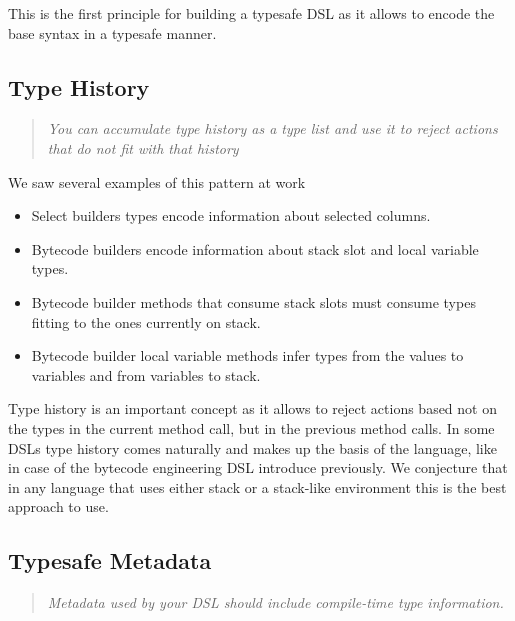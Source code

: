 \documentclass{sig-alternate}
\begin{document}
This is the first principle for building a typesafe DSL as it allows to encode the base syntax in a typesafe manner.

\subsection{Type History}

\begin{quote}
\emph{You can accumulate type history as a type list and use it to reject actions that do not fit with that history}
\end{quote}

We saw several examples of this pattern at work
\begin{itemize}
\item Select builders types encode information about selected columns. 
\item Bytecode builders encode information about stack slot and local variable types.
\item Bytecode builder methods that consume stack slots must consume types fitting to the ones currently on stack.
\item Bytecode builder local variable methods infer types from the values to variables and from variables to stack.
\end{itemize}

Type history is an important concept as it allows to reject actions based not on the types in the current method call, but in the previous method calls. In some DSLs type history comes naturally and makes up the basis of the language, like in case of the bytecode engineering DSL introduce previously. We conjecture that in any language that uses either stack or a stack-like environment this is the best approach to use.

\subsection{Typesafe Metadata}

\begin{quote}
\emph{Metadata used by your DSL should include compile-time type information.}
\end{quote}
\end{document}
